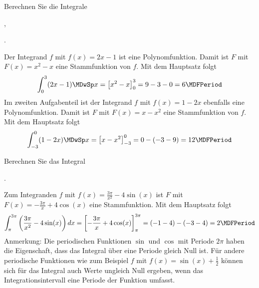 \begin{MExercises}
\begin{MExercise}
Berechnen Sie die Integrale
\begin{MExerciseItems}
\item{,}
\item{.}
\end{MExerciseItems}

\begin{MHint}{\iSolution}
Der Integrand $f$ mit $f(x) = 2 x - 1$ ist eine Polynomfunktion. Damit ist
$F$ mit $F(x) = x^2 - x$ eine Stammfunktion von $f$. Mit dem Hauptsatz 
folgt
\[
 \int_{0}^{3} (2 x - 1) \MDwSp x %
 = \left[ x^2 - x \right]_{0}^{3} %
 = 9 - 3 - 0%
 = 6 \MDFPeriod %
\]
Im zweiten Aufgabenteil ist der Integrand $f$ mit $f(x) = 1 - 2 x$ ebenfalls 
eine Polynomfunktion. Damit ist $F$ mit $F(x) = x - x^2$ eine Stammfunktion 
von $f$. Mit dem Hauptsatz folgt
\[
 \int_{-3}^{0} (1 - 2 x) \MDwSp x %
 = \left[ x - x^2 \right]_{-3}^{0} %
 = 0 - (-3 - 9)%
 = 12 \MDFPeriod %
\]
\end{MHint}
\end{MExercise}

\begin{MExercise}
Berechnen Sie das Integral

.

\begin{MHint}{\iSolution}
Zum Integranden $f$ mit $f(x) = \frac{3 \pi}{x^2} - 4 \sin(x)$ ist $F$ mit
$F(x) = -\frac{3 \pi}{x} + 4 \cos(x)$ eine Stammfunktion. Mit dem 
Hauptsatz folgt
\[
 \int_{\pi}^{3 \pi} \left(\frac{3 \pi}{x^2} - 4 \sin(x)\right) \MD x %
 = \left[ -\frac{3 \pi}{x} + 4 \cos(x) \right]_{\pi}^{3 \pi} %
 = ( -1 - 4 ) - ( -3 - 4 )%
 = 2 \MDFPeriod %
\]
Anmerkung: Die periodischen Funktionen $\sin$ und $\cos$ mit Periode $2 \pi$ 
haben die Eigenschaft, dass das Integral über eine Periode gleich Null ist. 
Für andere periodische Funktionen wie zum Beispiel $f$ mit 
$f(x) = \sin(x) + \frac{1}{2}$ können sich für das Integral auch Werte 
ungleich Null ergeben, wenn das Integrationsintervall eine Periode der 
Funktion umfasst.
\end{MHint}
\end{MExercise}

\end{MExercises}




